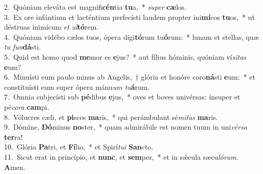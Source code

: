 {2.~}Quóniam eleváta est magnifi\textbf{cén}tia \textbf{tu}a,~* \textit{su}\textit{per} \textbf{cæ}los.\\
{3.~}Ex ore infántium et lacténtium perfecísti laudem propter ini\textbf{mí}cos \textbf{tu}os,~* ut déstruas inimícum \textit{et} \textit{ul}\textbf{tó}rem.\\
{4.~}Quóniam vidébo cælos tuos, ópera digi\textbf{tó}rum tu\textbf{ó}rum:~* lunam et stellas, quæ \textit{tu} \textit{fun}\textbf{dá}sti.\\
{5.~}Quid est homo quod \textbf{me}mor es \textbf{e}jus?~* aut fílius hóminis, quóniam ví\textit{si}\textit{tas} \textbf{e}um?\\
{6.~}Minuísti eum paulo minus ab Angelis,~† glória et honóre coro\textbf{ná}sti \textbf{e}um:~* et constituísti eum super ópera mánu\textit{um} \textit{tu}\textbf{á}rum.\\
{7.~}Omnia subjecísti sub \textbf{pé}dibus \textbf{e}jus,~* oves et boves univérsas: ínsuper et pé\textit{co}\textit{ra} \textbf{cam}pi.\\
{8.~}Vólucres cæli, et \textbf{pi}sces \textbf{ma}ris,~* qui perámbulant sé\textit{mi}\textit{tas} \textbf{ma}ris.\\
{9.~}Dómine, \textbf{Dó}minus \textbf{no}ster,~* quam admirábile est nomen tuum in uni\textit{vér}\textit{sa} \textbf{ter}ra!\\
{10.~}Glória \textbf{Pa}tri, et \textbf{Fí}lio,~* et Spirí\textit{tu}\textit{i} \textbf{San}cto.\\
{11.~}Sicut erat in princípio, et \textbf{nunc}, et \textbf{sem}per,~* et in sǽcula sæcu\textit{ló}\textit{rum}. \textbf{A}men.\\
